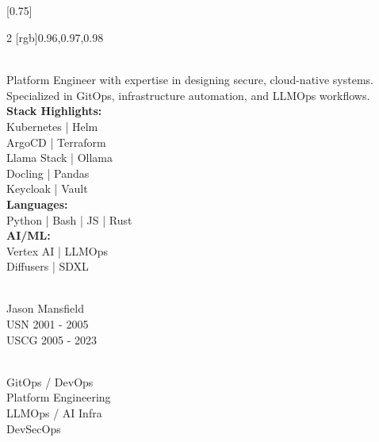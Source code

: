 \documentclass[lighthipster]{simplehipstercv}
\begin{document}
\thispagestyle{empty}


\subsection*{}
\vspace{4em}

\setlength{\columnsep}{1.5cm}
[0.75]
\begin{paracol}{2}
[rgb]{0.96,0.97,0.98} 
\paracolbackgroundoptions

\footnotesize
{\setasidefontcolour
\flushright  
\begin{center}
\end{center}

\\[0.5em]
Platform Engineer with expertise in designing secure, cloud-native systems. Specialized in GitOps, infrastructure automation, and LLMOps workflows.\\[1em]
\textbf{Stack Highlights:}\\
Kubernetes | Helm\\
ArgoCD | Terraform\\
Llama Stack | Ollama\\
Docling | Pandas\\
Keycloak | Vault\\[1em]
\textbf{Languages:}\\
Python | Bash | JS | Rust\\[1em]
\textbf{AI/ML:}\\
Vertex AI | LLMOps\\
Diffusers | SDXL

\bigskip

 \\[0.5em]
Jason Mansfield\\
USN 2001 - 2005\\
USCG 2005 - 2023

\bigskip

 \\[0.5em]
GitOps / DevOps\\
Platform Engineering\\
LLMOps / AI Infra\\
DevSecOps

\bigskip

}
\end{paracol}
\end{document}
